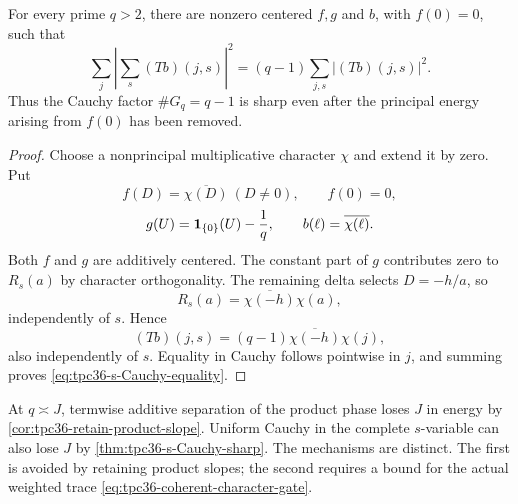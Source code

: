 \begin{theorem}
\label{thm:tpc36-s-Cauchy-sharp}
For every prime \(q>2\), there are nonzero centered \(f,g\) and \(b\), with
\(f(0)=0\), such that
\begin{equation}
 \boxed{
 \sum_j\left|\sum_s(Tb)(j,s)\right|^2
 =(q-1)\sum_{j,s}|(Tb)(j,s)|^2.}
 \label{eq:tpc36-s-Cauchy-equality}
\end{equation}
Thus the Cauchy factor \(\#G_q=q-1\) is sharp even after the principal
energy arising from \(f(0)\) has been removed.
\end{theorem}

\begin{proof}
Choose a nonprincipal multiplicative character \(\chi\) and extend it by
zero.  Put
\begin{equation}
 f(D)=\overline{\chi(D)}\ (D\ne0),\qquad f(0)=0,
 \label{eq:tpc36-sharp-f}
\end{equation}
\begin{equation}
 g(U)=\mathbf 1_{\{0\}}(U)-\frac1q,
 \qquad
 b(\ell)=\overline{\chi(\ell)}.
 \label{eq:tpc36-sharp-gb}
\end{equation}
Both \(f\) and \(g\) are additively centered.  The constant part of \(g\)
contributes zero to \(R_s(a)\) by character orthogonality.  The remaining
delta selects \(D=-h/a\), so
\begin{equation}
 R_s(a)=\overline{\chi(-h)}\chi(a),
 \label{eq:tpc36-sharp-R}
\end{equation}
independently of \(s\).  Hence
\begin{equation}
 (Tb)(j,s)
 =(q-1)\overline{\chi(-h)}\chi(j),
 \label{eq:tpc36-sharp-T}
\end{equation}
also independently of \(s\).  Equality in Cauchy follows pointwise in
\(j\), and summing proves \eqref{eq:tpc36-s-Cauchy-equality}.
\end{proof}

\begin{remark}
At \(q\asymp J\), termwise additive separation of the product phase loses
\(J\) in energy by \cref{cor:tpc36-retain-product-slope}.  Uniform Cauchy
in the complete \(s\)-variable can also lose \(J\) by
\cref{thm:tpc36-s-Cauchy-sharp}.  The mechanisms are distinct.  The first
is avoided by retaining product slopes; the second requires a bound for
the actual weighted trace \eqref{eq:tpc36-coherent-character-gate}.
\end{remark}
